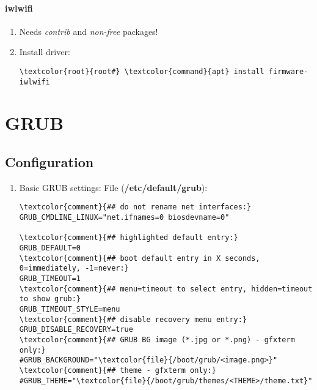 \documentclass[10pt, a4paper, onecolumn, openany]{book} %
\begin{document}
\subsubsection{iwlwifi}
\begin{enumerate}
    \item Needs \textit{contrib} and \textit{non-free} packages!
    \item Install driver:
\begin{Verbatim}[commandchars=\\\{\}]
\textcolor{root}{root#} \textcolor{command}{apt} install firmware-iwlwifi
\end{Verbatim}
\end{enumerate}
\chapter{GRUB}
\section{Configuration}
\begin{enumerate}
    \item Basic GRUB settings:
\newline File (\textbf{\textcolor{file}{/etc/default/grub}}):
\begin{Verbatim}[commandchars=\\\{\}]
\textcolor{comment}{## do not rename net interfaces:}
GRUB_CMDLINE_LINUX="net.ifnames=0 biosdevname=0"

\textcolor{comment}{## highlighted default entry:}
GRUB_DEFAULT=0
\textcolor{comment}{## boot default entry in X seconds, 0=immediately, -1=never:}
GRUB_TIMEOUT=1
\textcolor{comment}{## menu=timeout to select entry, hidden=timeout to show grub:}
GRUB_TIMEOUT_STYLE=menu
\textcolor{comment}{## disable recovery menu entry:}
GRUB_DISABLE_RECOVERY=true
\textcolor{comment}{## GRUB BG image (*.jpg or *.png) - gfxterm only:}
#GRUB_BACKGROUND="\textcolor{file}{/boot/grub/<image.png>}"
\textcolor{comment}{## theme - gfxterm only:}
#GRUB_THEME="\textcolor{file}{/boot/grub/themes/<THEME>/theme.txt}"
\end{Verbatim}
\end{enumerate}
\end{document}
